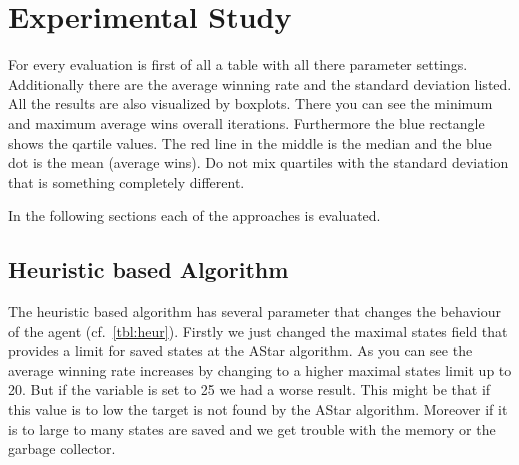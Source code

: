 
\section{Experimental Study} 
\label{sec:exp}



For every evaluation is first of all a table with all there parameter settings. Additionally there are the average winning rate and the standard deviation listed.
All the results are also visualized by boxplots. There you can see the minimum and maximum average wins overall iterations. Furthermore the blue rectangle shows 
the qartile values. The red line in the middle is the median and the blue dot is the mean (average wins).
Do not mix quartiles with the standard deviation that is something completely different.

In the following sections each of the approaches is evaluated. 


\subsection{Heuristic based Algorithm} 

The heuristic based algorithm has several parameter that changes the behaviour of the agent (cf.~\cref{tbl:heur}).
Firstly we just changed the maximal states field that provides a limit for saved states at
the AStar algorithm. As you can see the average winning rate increases by changing to a higher maximal states limit up to 20.
But if the variable is set to 25 we had a worse result. This might be that if this value is to low the target is not found 
by the AStar algorithm. Moreover if it is to large to many states are saved and we get trouble with the memory or the
garbage collector.


